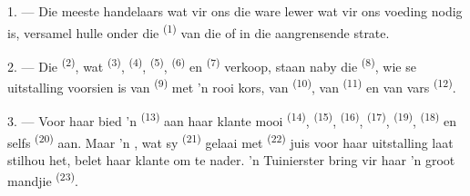 %
%
%

\VUsaut{4.0mm}
\VUsaut{3.0mm}

\VUsaut{3.0mm}

1. --- Die meeste handelaars wat vir ons die ware lewer wat vir ons voeding nodig is,
versamel hulle onder die  \textsuperscript{(1)} van die  of in die aangrensende strate.

2. --- Die  \textsuperscript{(2)}, wat 
\textsuperscript{(3)},  \textsuperscript{(4)}, 
\textsuperscript{(5)},  \textsuperscript{(6)} en 
\textsuperscript{(7)} verkoop, staan naby die 
\textsuperscript{(8)}, wie se uitstalling voorsien is van 
\textsuperscript{(9)} met 'n rooi kors, van 
\textsuperscript{(10)}, van  \textsuperscript{(11)} en van vars
 \textsuperscript{(12)}.

3. --- Voor haar bied 'n  \textsuperscript{(13)} aan haar
klante mooi  \textsuperscript{(14)}, 
\textsuperscript{(15)},  \textsuperscript{(16)}, 
\textsuperscript{(17)},  \textsuperscript{(19)},
 \textsuperscript{(18)} en selfs 
\textsuperscript{(20)} aan. Maar 'n , wat sy 
\textsuperscript{(21)} gelaai met  \textsuperscript{(22)} juis voor haar
uitstalling laat stilhou het, belet haar klante om te nader. 'n Tuinierster bring vir
haar 'n groot mandjie  \textsuperscript{(23)}.

